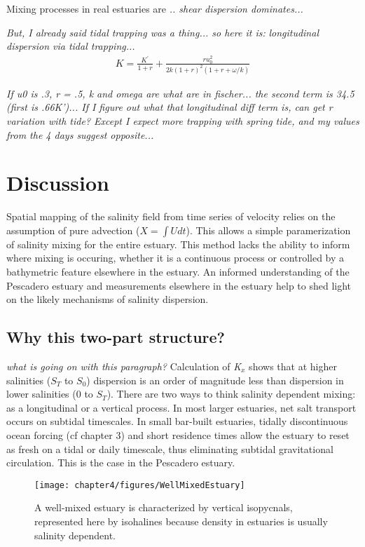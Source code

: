 Mixing processes in real estuaries are \emph{.. shear dispersion dominates... }

\emph{But, I already said tidal trapping was a thing... so here it is:}
\emph{longitudinal dispersion via tidal trapping...}
\begin{eqnarray}
K = \frac{K^{'}}{1+r} + \frac{ru_0^2}{2k(1+r)^2(1+r+\omega / k)} \label{eq:KxOkubo}
\end{eqnarray}

\emph{If u0 is .3, r = .5, k and omega are what are in fischer... the second term is 34.5 (first is .66K')... If I figure out what that longitudinal diff term is, can get r variation with tide? Except I expect more trapping with spring tide, and my values from the 4 days suggest opposite...}

\section{Discussion} \label{sec:discCh4}

Spatial mapping of the salinity field from time series of velocity relies on the assumption of pure advection ($X = \int{U}dt$). This allows a simple paramerization of salinity mixing for the entire estuary. This method lacks the ability to inform where mixing is occuring, whether it is a continuous process or controlled by a bathymetric feature elsewhere in the estuary. An informed understanding of the Pescadero estuary and measurements elsewhere in the estuary help to shed light on the likely mechanisms of salinity dispersion.

\subsection{Why this two-part structure?}

\emph{what is going on with this paragraph?}
Calculation of \emph{K$_x$} shows that at higher salinities ($S_T$ to $S_0$) dispersion is an order of magnitude less than dispersion in lower salinities (0 to $S_T$). There are two ways to think salinity dependent mixing: as a longitudinal or a vertical process. In most larger estuaries, net salt transport occurs on subtidal timescales. In small bar-built estuaries, tidally discontinuous ocean forcing (cf chapter 3) and short residence times allow the estuary to reset as fresh on a tidal or daily timescale, thus eliminating subtidal gravitational circulation. This is the case in the Pescadero estuary.

\begin{figure}[h]
\centering
	\texttt{[image: chapter4/figures/WellMixedEstuary]}
	\caption{A well-mixed estuary is characterized by vertical isopycnals, represented here by isohalines because density in estuaries is usually salinity dependent.} \label{fig:WellMixedEstuary}
\end{figure}

